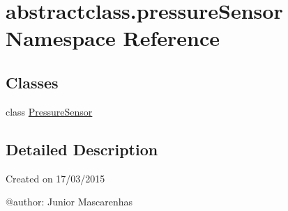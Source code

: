 \hypertarget{namespaceabstractclass_1_1pressureSensor}{}\section{abstractclass.\+pressure\+Sensor Namespace Reference}
\label{namespaceabstractclass_1_1pressureSensor}
\subsection*{Classes}
\begin{DoxyCompactItemize}
\item 
class \hyperlink{classabstractclass_1_1pressureSensor_1_1PressureSensor}{Pressure\+Sensor}
\end{DoxyCompactItemize}


\subsection{Detailed Description}
\begin{DoxyVerb}Created on 17/03/2015

@author: Junior Mascarenhas
\end{DoxyVerb}
 